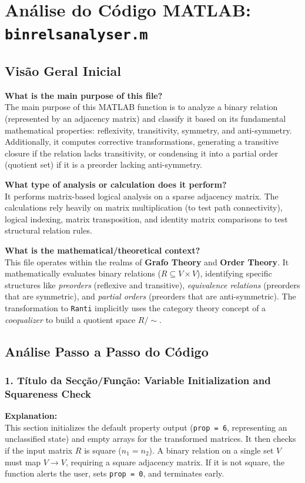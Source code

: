 
\chapter{Análise do Código MATLAB: \texttt{binrelsanalyser.m}}
\author{Expert Software Engineer}
\date{\today}
\section{Visão Geral Inicial}

\textbf{What is the main purpose of this file?} \\
The main purpose of this MATLAB function is to analyze a binary relation (represented by an adjacency matrix) and classify it based on its fundamental mathematical properties: reflexivity, transitivity, symmetry, and anti-symmetry. Additionally, it computes corrective transformations, generating a transitive closure if the relation lacks transitivity, or condensing it into a partial order (quotient set) if it is a preorder lacking anti-symmetry.

\textbf{What type of analysis or calculation does it perform?} \\
It performs matrix-based logical analysis on a sparse adjacency matrix. The calculations rely heavily on matrix multiplication (to test path connectivity), logical indexing, matrix transposition, and identity matrix comparisons to test structural relation rules.

\textbf{What is the mathematical/theoretical context?} \\
This file operates within the realms of \textbf{Grafo Theory} and \textbf{Order Theory}. It mathematically evaluates binary relations ($R \subseteq V \times V$), identifying specific structures like \textit{preorders} (reflexive and transitive), \textit{equivalence relations} (preorders that are symmetric), and \textit{partial orders} (preorders that are anti-symmetric). The transformation to \texttt{Ranti} implicitly uses the category theory concept of a \textit{coequalizer} to build a quotient space $R/{\sim}$.

\vspace{1em}

\vspace{1em}

\section{Análise Passo a Passo do Código}

\subsection{1. Título da Secção/Função: Variable Initialization and Squareness Check}
\textbf{Explanation:} \\
This section initializes the default property output (\texttt{prop = 6}, representing an unclassified state) and empty arrays for the transformed matrices. It then checks if the input matrix $R$ is square ($n_1 = n_2$). A binary relation on a single set $V$ must map $V \to V$, requiring a square adjacency matrix. If it is not square, the function alerts the user, sets \texttt{prop = 0}, and terminates early.

